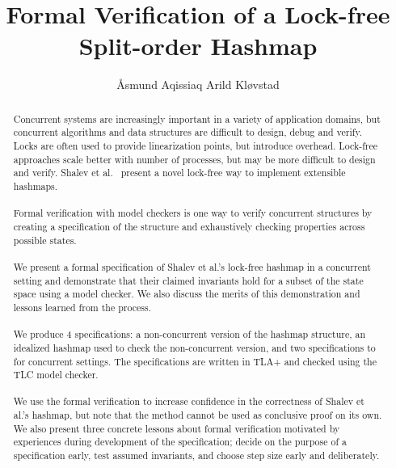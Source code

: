 \documentclass{uit-thesis}
\begin{document}
\title{Formal Verification of a Lock-free Split-order Hashmap}
\author{Åsmund Aqissiaq Arild Kløvstad}

\maketitle

\frontmatter

\begin{epigraph}
\end{epigraph}

\tableofcontents

\begin{abstract}
    Concurrent systems are increasingly important in a variety of application domains, but concurrent algorithms and data structures are difficult to design, debug and verify. Locks are often used to provide linearization points, but introduce overhead. Lock-free approaches scale better with number of processes, but may be more difficult to design and verify. Shalev et al.~\cite{Shalev2006} present a novel lock-free way to implement extensible hashmaps.\\\\
    Formal verification with model checkers is one way to verify concurrent structures by creating a specification of the structure and exhaustively checking properties across possible states.
    \\\\%
    We present a formal specification of Shalev et al.'s lock-free hashmap in a concurrent setting and demonstrate that their claimed invariants hold for a subset of the state space using a model checker. We also discuss the merits of this demonstration and lessons learned from the process.
    \\\\%
    We produce 4 specifications: a non-concurrent version of the hashmap structure, an idealized hashmap used to check the non-concurrent version, and two specifications to for concurrent settings. The specifications are written in TLA+ and checked using the TLC model checker.
    \\\\%
    We use the formal verification to increase confidence in the correctness of Shalev et al.'s hashmap, but note that the method cannot be used as conclusive proof on its own. We also present three concrete lessons about formal verification motivated by experiences during development of the specification; decide on the purpose of a specification early, test assumed invariants, and choose step size early and deliberately.
\end{abstract}
\end{document}
